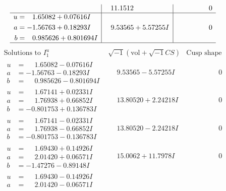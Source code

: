 \documentclass[1p]{elsarticle_modified}
\theoremstyle{definition}
\newcommand{\I}{\sqrt{-1}}
\begin{document}
$$\begin{array}{c|c|c}
 & \phantom{-}11.1512\phantom{ +0.000000I} & \phantom{-0.000000 } 0 \\ \hline\begin{aligned}
u &= \phantom{-}1.65082 + 0.07616 I \\
a &= -1.56763 + 0.18293 I \\
b &= \phantom{-}0.985626 + 0.801694 I\end{aligned}
 & \phantom{-}9.53565 + 5.57255 I & \phantom{-0.000000 } 0\\
 \hline 
 \end{array}$$\newpage$$\begin{array}{c|c|c}  
\text{Solutions to }I^u_{1}& \I (\text{vol} + \sqrt{-1}CS) & \text{Cusp shape}\\
 \hline 
\begin{aligned}
u &= \phantom{-}1.65082 - 0.07616 I \\
a &= -1.56763 - 0.18293 I \\
b &= \phantom{-}0.985626 - 0.801694 I\end{aligned}
 & \phantom{-}9.53565 - 5.57255 I & \phantom{-0.000000 } 0 \\ \hline\begin{aligned}
u &= \phantom{-}1.67141 + 0.02331 I \\
a &= \phantom{-}1.76938 + 0.66852 I \\
b &= -0.801753 + 0.136783 I\end{aligned}
 & \phantom{-}13.80520 + 2.24218 I & \phantom{-0.000000 } 0 \\ \hline\begin{aligned}
u &= \phantom{-}1.67141 - 0.02331 I \\
a &= \phantom{-}1.76938 - 0.66852 I \\
b &= -0.801753 - 0.136783 I\end{aligned}
 & \phantom{-}13.80520 - 2.24218 I & \phantom{-0.000000 } 0 \\ \hline\begin{aligned}
u &= \phantom{-}1.69430 + 0.14926 I \\
a &= \phantom{-}2.01420 + 0.06571 I \\
b &= -1.47276 - 0.89148 I\end{aligned}
 & \phantom{-}15.0062 + 11.7978 I & \phantom{-0.000000 } 0 \\ \hline\begin{aligned}
u &= \phantom{-}1.69430 - 0.14926 I \\
a &= \phantom{-}2.01420 - 0.06571 I \\

\end{aligned}
\end{array}$$
\end{document}

